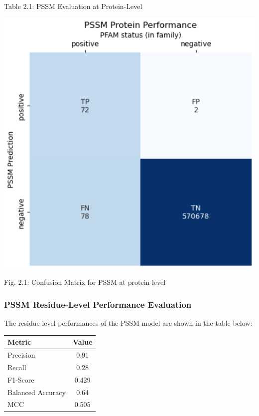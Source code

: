 \documentclass[10pt,twocolumn,letterpaper]{article}
\begin{document}
\begin{center}
    \small{Table 2.1: PSSM Evaluation at Protein-Level}
\end{center}


\begin{center}
    \includegraphics[scale=0.45]{report/img/pssm_prot_performance.png}
\end{center}

\begin{center}
    \small{Fig. 2.1: Confusion Matrix for PSSM at protein-level}
\end{center}

\subsubsection{PSSM Residue-Level Performance Evaluation}

The residue-level performances of the PSSM model are shown in the table below:


\begin{center}
    \begin{tabular}{lc}
        \toprule
        Metric & Value \\
        \midrule
        Precision & 0.91 \\
        Recall & 0.28 \\
        F1-Score & 0.429 \\
        Balanced Accuracy & 0.64 \\
        MCC & 0.505 \\
        \bottomrule
    \end{tabular}
\end{center} \\
\end{document}
